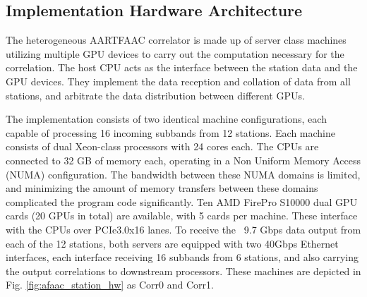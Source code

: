 \documentclass{ws-jai}
\begin{document}
\subsection  {Implementation  Hardware  Architecture} 
The  heterogeneous AARTFAAC  correlator  is  made up  of  server class  machines
utilizing multiple  GPU devices to carry  out the computation necessary  for the
correlation.  The  host CPU acts as  the interface between the  station data and
the GPU devices.   They implement the data reception and  collation of data from
all stations, and arbitrate the data distribution between different GPUs.







The  implementation  consists  of  two identical  machine  configurations,  each
capable  of processing  16  incoming  subbands from  12  stations. Each  machine
consists  of  dual Xeon-class  processors  with  24  cores  each. The  CPUs  are
connected to  32 GB  of memory each,  operating in a  Non Uniform  Memory Access
(NUMA) configuration. The  bandwidth between these NUMA domains  is limited, and
minimizing the amount of memory  transfers between these domains complicated the
program code significantly.   Ten AMD FirePro S10000 dual GPU  cards (20 GPUs in
total) are available,  with 5 cards per machine.  These  interface with the CPUs
over PCIe3.0x16 lanes.  To receive the ~9.7 Gbps data output from each of the 12
stations, both  servers are equipped  with two 40Gbps Ethernet  interfaces, each
interface receiving  16 subbands from 6  stations, and also carrying  the output
correlations  to downstream  processors.  These  machines are  depicted in  Fig.
\ref{fig:afaac_station_hw} as Corr0 and Corr1.\\
\end{document}
